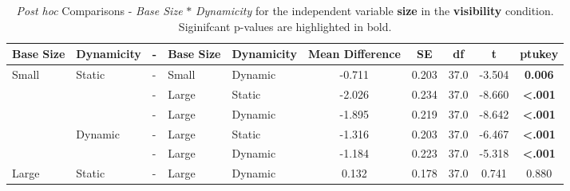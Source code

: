 \begin{table*}[ht]
    \centering
    \caption{\textit{Post hoc} Comparisons - \textit{Base Size} $\ast$ \textit{Dynamicity} for the independent variable \textbf{size} in the \textbf{visibility} condition. Siginifcant p-values are highlighted in bold.}
    \begin{tabular}{lllll|ccccc}
    \toprule
    \textbf{Base Size}   & \textbf{Dynamicity} & -  & \textbf{Base Size}    & \textbf{Dynamicity} & \textbf{Mean Difference} & \textbf{SE} & \textbf{df} & \textbf{t} & \textbf{ptukey} \\
    \midrule
    Small                & Static              & - & Small                  & Dynamic             & -0.711                   & 0.203       & 37.0        & -3.504     & \textbf{0.006}           \\
                         &                     & - & Large                  & Static              & -2.026                   & 0.234       & 37.0        & -8.660     & \textbf{<.001}           \\
                         &                     & - & Large                  & Dynamic             & -1.895                   & 0.219       & 37.0        & -8.642     & \textbf{<.001}           \\
                         & Dynamic             & - & Large                  & Static              & -1.316                   & 0.203       & 37.0        & -6.467     & \textbf{<.001}           \\
                         &                     & - & Large                  & Dynamic             & -1.184                   & 0.223       & 37.0        & -5.318     & \textbf{<.001}           \\
    Large                & Static              & - & Large                  & Dynamic             & 0.132                    & 0.178       & 37.0        & 0.741      & 0.880           \\
    \bottomrule                           
    \end{tabular}
\end{table*}

